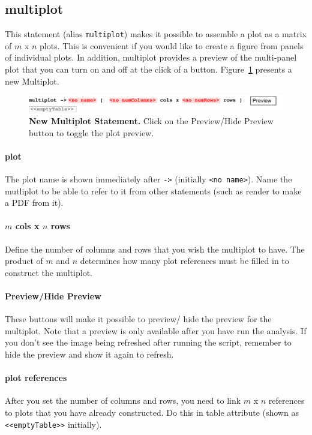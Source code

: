 \subsection{multiplot}
This statement (alias \texttt{multiplot}) makes it possible to assemble a plot as a matrix of $m$ x $n$ plots. This is convenient if you would like to create a figure from panels of individual plots. In addition, multiplot provides a preview of the multi-panel plot that you can turn on and off at the click of a button. Figure~\ref{fig:NewMultiplot} presents a new Multiplot.


\begin{figure}[h!tbp]
  \centering
  \includegraphics[width=\figWidthWide]{figures/NewMultiplot.pdf}
\caption[New Multiplot Statement.]{\textbf{New Multiplot Statement.} Click on the Preview/Hide Preview button to toggle the plot preview.}
\label{fig:NewMultiplot}
\end{figure}

\paragraph{plot}
The plot name is shown immediately after \texttt{->} (initially \texttt{<no name>}). Name the mutliplot to be able to refer to it from other statements (such as render to make a PDF from it).
\paragraph{$m$ cols x $n$ rows}
Define the number of columns and rows that you wish the multiplot to have. 
The product of $m$ and $n$ determines how many plot references must be filled in to construct the multiplot.

\paragraph{Preview/Hide Preview}
These buttons will make it possible to preview/ hide the preview for the multiplot. Note that a preview is only available after you have run the analysis. If you don't see the image being refreshed after running the script, remember to hide the preview and show it again to refresh.

\paragraph{plot references}
After you set the number of columns and rows, you need to link  $m$ x $n$ references to plots that you have already constructed. Do this in table attribute (shown as \texttt{<<emptyTable>>} initially).


